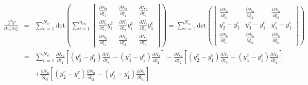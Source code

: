 \documentclass[12pt,aps,pre]{revtex4}
\begin{document}
\begin{eqnarray}
\frac{\partial^2 V}{\partial x_a^e \partial z_b^e} &=&  \sum_{e=1}^{N_{el}} \text{det}\left(\sum_{i=1}^{n_{en}}
%
\begin{bmatrix}
\frac{\partial N_a}{\partial \xi_1}  &  \frac{\partial N_a}{\partial \xi_2} &  \frac{\partial N_a}{\partial \xi_3}\\
%
\frac{\partial N_i}{\partial \xi_1}y_i^e  & \frac{\partial N_i}{\partial \xi_2}y_i^e &\frac{\partial N_i}{\partial \xi_3}y_1^e  \\
%
\frac{\partial N_b}{\partial \xi_1}  & \frac{\partial N_b}{\partial \xi_2} & \frac{\partial N_b}{\partial \xi_3} 
\end{bmatrix}\right) 
%
= \sum_{e=1}^{N_{el}} \text{det}\left(
%
\begin{bmatrix}
\frac{\partial N_a}{\partial \xi_1}  &  \frac{\partial N_a}{\partial \xi_2} &  \frac{\partial N_a}{\partial \xi_3}\\
%
y_2^e - y_1^e & y_3^e - y_1^e & y_4^e - y_1^e \\
%
\frac{\partial N_b}{\partial \xi_1}  & \frac{\partial N_b}{\partial \xi_2} & \frac{\partial N_b}{\partial \xi_3} 
\end{bmatrix}\right) \nonumber\\
&=& \sum_{e=1}^{N_{el}}\frac{\partial N_a}{\partial \xi_1}\left[(y_3^e - y_1^e)\frac{\partial N_b}{\partial \xi_3}-(y_4^e - y_1^e)\frac{\partial N_b}{\partial \xi_2}\right] 
%
-\frac{\partial N_a}{\partial \xi_2}\left[(y_2^e - y_1^e)\frac{\partial N_b}{\partial \xi_3}-(y_4^e - y_1^e)\frac{\partial N_b}{\partial \xi_1}\right] \nonumber\\
%
&&+\frac{\partial N_a}{\partial \xi_3}\left[(y_2^e - y_1^e)\frac{\partial N_b}{\partial \xi_2}-(y_3^e - y_1^e)\frac{\partial N_b}{\partial \xi_1}\right] 
\end{eqnarray}
\end{document}
